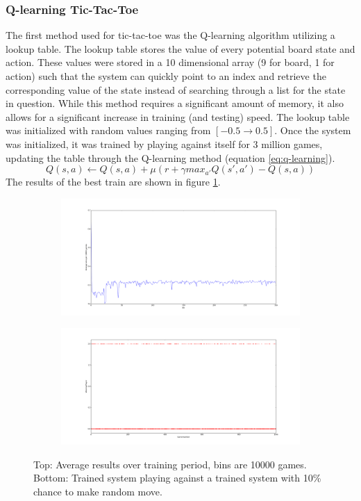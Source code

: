 \documentclass[12pt,a4paper]{article}
\begin{document}
\subsubsection*{Q-learning Tic-Tac-Toe}
The first method used for tic-tac-toe was the Q-learning algorithm utilizing a lookup table. The lookup table stores the value of every potential board state and action. These values were stored in a 10 dimensional array (9 for board, 1 for action) such that the system can quickly point to an index and retrieve the corresponding value of the state instead of searching through a list for the state in question. While this method requires a significant amount of memory, it also allows for a significant increase in training (and testing) speed. The lookup table was initialized with random values ranging from $[-0.5 \rightarrow 0.5]$. Once the system was initialized, it was trained by playing against itself for 3 million games, updating the table through the Q-learning method (equation \ref{eq:q-learning}). 
\begin{equation}
{Q(s,a)} \leftarrow {Q(s,a) + \mu(r + \gamma max_{a'}Q(s',a')-Q(s,a))}
\label{eq:q-learning}
\end{equation}
The results of the best train are shown in figure \ref{fig:training}.
\begin{figure}[h]
\centering
\begin{subfigure}[h]{0.8\textwidth}
\includegraphics[width=\textwidth]{Figures/train01epsilon.png}
\end{subfigure}
\begin{subfigure}[h]{0.8\textwidth}
\includegraphics[width=\textwidth]{Figures/Optimalstateresults.png}
\end{subfigure}
\caption{Top: Average results over training period, bins are 10000 games. Bottom: Trained system playing against a trained system with 10\% chance to make random move.}
\label{fig:training}
\end{figure}
\end{document}
